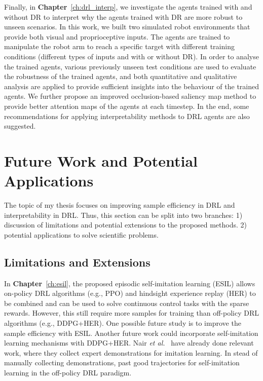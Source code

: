 Finally, in \textbf{Chapter}~\ref{ch:drl_interp}, we investigate the agents trained with and without DR to interpret why the agents trained with DR are more robust to unseen scenarios. In this work, we built two simulated robot environments that provide both visual and proprioceptive inputs. The agents are trained to manipulate the robot arm to reach a specific target with different training conditions (different types of inputs and with or without DR). In order to analyse the trained agents, various previously unseen test conditions are used to evaluate the robustness of the trained agents, and both quantitative and qualitative analysis are applied to provide sufficient insights into the behaviour of the trained agents. We further propose an improved occlusion-based saliency map method to provide better attention maps of the agents at each timestep.  In the end, some recommendations for applying interpretability methods to DRL agents are also suggested. 


\section{Future Work and Potential Applications}
The topic of my thesis focuses on improving sample efficiency in DRL and interpretability in DRL. Thus, this section can be split into two branches: 1) discussion of limitations and potential extensions to the proposed methods. 2) potential applications to solve scientific problems.

\subsection{Limitations and Extensions}
In \textbf{Chapter}~\ref{ch:esil}, the proposed episodic self-imitation learning (ESIL) allows on-policy DRL algorithms (e.g., PPO) and hindsight experience replay (HER) to be combined and can be used to solve continuous control tasks with the sparse rewards. However, this still require more samples for training than off-policy DRL algorithms (e.g., DDPG+HER). One possible future study is to improve the sample efficiency with ESIL. Another future work could incorporate self-imitation learning mechanisms with DDPG+HER. Nair \textit{et al.}~\cite{nair2018overcoming} have already done relevant work, where they collect expert demonstrations for imitation learning. In stead of manually collecting demonstrations,  past good trajectories for self-imitation learning in the off-policy DRL paradigm.

